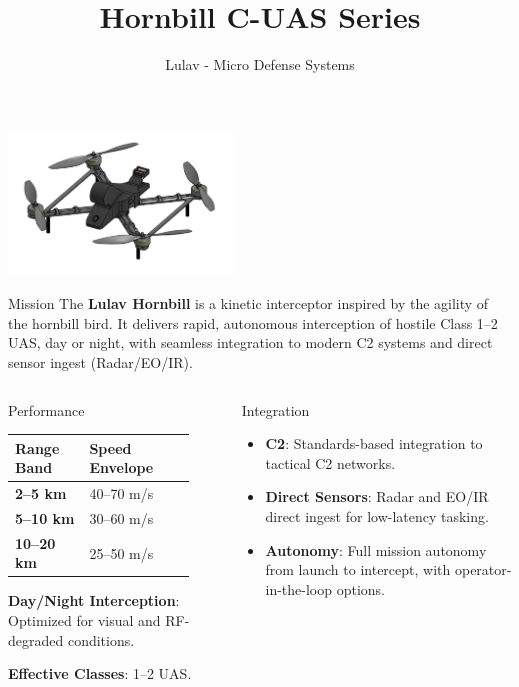 \documentclass[english,final,hyperref={pdfpagelabels=false}]{beamer}
\begin{document}
\title[]{Hornbill C-UAS Series}
\author[]{Lulav - Micro Defense Systems}
\begin{frame}{ }
\begin{center}
\includegraphics[width=0.45\textwidth]{lulav_hornbill.png}
\end{center}
\vfill
\begin{block}{\Large Mission}
\large The \textbf{Lulav Hornbill} is a kinetic interceptor inspired by the agility of the hornbill bird. 
It delivers rapid, autonomous interception of hostile Class 1--2 UAS, day or night, with seamless integration to modern C2 systems and direct sensor ingest (Radar/EO/IR).
\end{block}
\begin{columns}[t]
\begin{block}{\Large Performance}
\begin{center}
\begin{tabular}{>{\bfseries}m{0.35\linewidth} m{0.5\linewidth}}
Range Band & Speed Envelope \\\midrule
2--5 km  & 40--70 m/s \\
5--10 km & 30--60 m/s \\
10--20 km & 25--50 m/s \\
\end{tabular}
\end{center}
\vspace{1ex}
\textbf{Day/Night Interception}: Optimized for visual and RF-degraded conditions.

\textbf{Effective Classes}: 1--2 UAS.
\end{block}

\begin{block}{\Large Integration}
\begin{itemize}
    \item \textbf{C2}: Standards-based integration to tactical C2 networks.
    \item \textbf{Direct Sensors}: Radar and EO/IR direct ingest for low-latency tasking.
    \item \textbf{Autonomy}: Full mission autonomy from launch to intercept, with operator-in-the-loop options.
\end{itemize}
\end{block}


\end{columns}
\end{frame}
\end{document}
